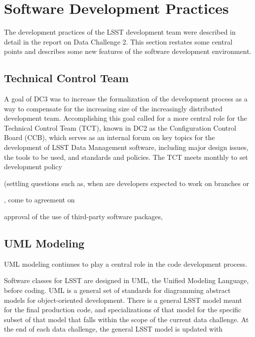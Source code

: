 
\section{Software Development Practices}

The development practices of the LSST development team were 
described in detail in the report on Data Challenge 2. This
section restates some central points and describes some new
features of the software development environment.


\subsection{Technical Control Team}

A goal of DC3 was to increase the formalization of the
development process as a way to compensate for the increasing
size of the increasingly distributed development team.
Accomplishing this goal called for a more central role for
the Technical Control Team (TCT), known in DC2 as the
Configuration Control Board (CCB), which serves as an internal
forum on key topics for the development of LSST Data Management software, including 
major design issues, the tools to be used, and standards and policies.
The TCT meets monthly to set development policy 




(settling 
questions such as, when are developers expected to work
on branches or 



, come to agreement on 

approval of the use of third-party software packages,



\subsection{UML Modeling}

UML modeling continues to play a central role in the code
development process. 

Software classes for LSST are designed in UML, the Unified
Modeling Language, before coding. UML is a general set of 
standards for diagramming abstract models for object-oriented
development. There is a general LSST model meant for the
final production code, and specializations of that model for
the specific subset of that model that falls within the scope
of the current data challenge. At the end of each data
challenge, the general LSST model is updated with 

